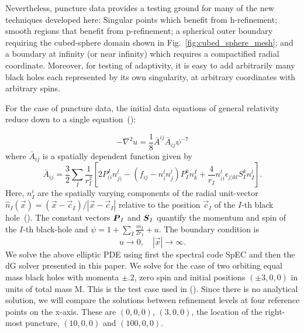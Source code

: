 Nevertheless, puncture data provides a testing ground for many
  of the new techniques developed here: Singular points which benefit
  from h-refinement; smooth regions that benefit from p-refinement; a
  spherical outer boundary requiring the cubed-sphere domain shown in
  Fig.~\ref{fig:cubed_sphere_mesh}; and a boundary at infinity (or
  near infinity) which requires a compactified radial coordinate.
  Moreover, for testing of adaptivity, it is easy to add arbitrarily
  many black holes each represented by its own singularity, at
  arbitrary coordinates with arbitrary spins.

For the case of puncture data, the initial data equations of general relativity
reduce down to a single equation~(\cite{brandt1997simple}):

\begin{equation}
\label{eq:Two_Punctures_PDE}
-\nabla^2 u = \frac{1}{8}\bar A^{ij} \bar A_{ij}\psi^{-7}
\end{equation}
%
where $\bar A_{ij}$ is a spatially dependent function given by
%
\begin{equation}
  \label{eq:Two_Punctures_Aij}
\bar{A}_{ij} = \frac{3}{2}\sum_{I}\frac{1}{r^{2}_{I}}[2P^{I}_{(i}n^{l}_{j)}-(f_{ij}-n^{l}_{i}n^l_j)P^{k}_{I}n^I_k + \frac{4}{r_{I}}n^l_{(i}\epsilon_{j)kl}S^k_In^l_I].
\end{equation}
%
Here, $n^i_I$ are the spatially varying components of the radial unit-vector $\hat n_{I}(\vec x)=(\vec{x}-\vec c_{I})/|\vec x-\vec c_I|$ relative to the position $\vec c_I$ of the $I$-th black hole~(\cite{brandt1997simple}). The constant vectors $\boldsymbol{P}_{I}$ and $\boldsymbol{S}_{I}$
quantify the momentum and spin of the $I$-th black-hole and $\psi = 1 + \sum_I \frac{m_{I}}{2r_{I}}+u$. The boundary condition is
%
\begin{equation}
  u\to 0,\quad |\vec x| \to \infty.
\end{equation}
%
We solve the above elliptic PDE using first the spectral code SpEC and
then the dG solver presented in this paper. We solve for the case of
two orbiting equal mass black holes with momenta $\pm .2$, zero spin
and initial positions $(\pm 3, 0, 0)$ in units of total mass M. This
is the test case used in (\cite{ansorg2007}). Since there is no
analytical solution, we will compare the solutions between refinement
levels at four reference points on the x-axis. These are $(0,0,0)$,
$(3,0,0)$, the location of the right-most puncture, $(10,0,0)$ and
$(100,0,0)$.

